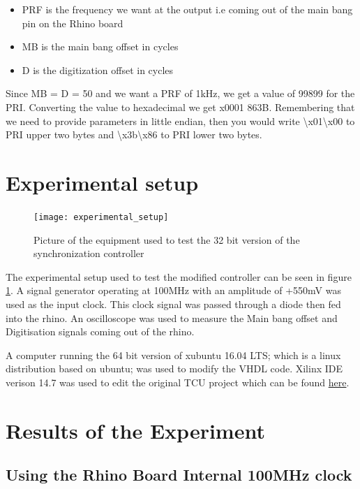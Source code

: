 \documentclass[12pt, a4paper]{article}
\begin{document}
	\begin{itemize}
  		\item PRF is the frequency we want at the output i.e coming out of the main bang pin on the Rhino board
  		\item MB is the main bang offset in cycles
  		\item D is the digitization offset in cycles
	\end{itemize}

Since MB = D = 50 and we want a PRF of 1kHz, we get a value of 99899 for the PRI. Converting the value to hexadecimal we get x0001 863B. Remembering that we need to provide parameters in little endian, then you would write \textbackslash x01\textbackslash x00 to PRI upper two bytes and \textbackslash x3b\textbackslash x86 to PRI lower two bytes.

\section{Experimental setup}

	\begin{figure}[h]
		\centering
		\texttt{[image: experimental\_setup]}
		\caption{Picture of the equipment used to test the 32 bit version of the synchronization controller}
		\label{fig:exp_setup}
	\end{figure}
	

The experimental setup used to test the modified controller can be seen in figure \ref{fig:exp_setup}. A signal generator operating at 100MHz with an amplitude of +550mV was used as the input clock. This clock signal was passed through a diode then fed into the rhino. An oscilloscope was used to measure the Main bang offset and Digitisation signals coming out of the rhino. 

A computer running the 64 bit version of xubuntu 16.04 LTS; which is a linux distribution based on ubuntu; was used to modify the VHDL code. Xilinx IDE verison 14.7 was used to edit the original TCU  project which can be found \href{https://github.com/Skippy01/NeXtRAD-TCU/tree/master/NeXtRAD-TCU-Controller}{here}.



\section{Results of the Experiment}

\subsection{Using the Rhino Board Internal 100MHz clock}
\end{document}
